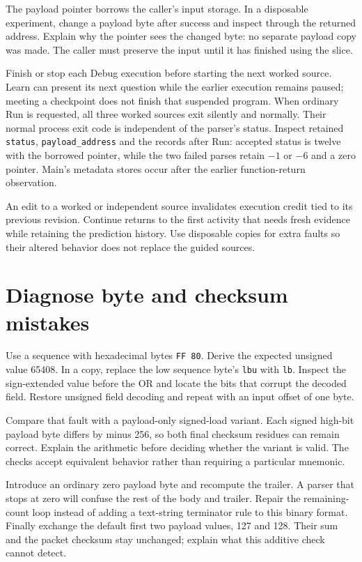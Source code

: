 

The payload pointer borrows the caller's input storage. In a disposable experiment,
change a payload byte after success and inspect through the returned address.
Explain why the pointer sees the changed byte: no separate payload copy was made.
The caller must preserve the input until it has finished using the slice.

Finish or stop each Debug execution before starting the next worked source.
Learn can present its next question while the earlier execution remains paused;
meeting a checkpoint does not finish that suspended program. When ordinary Run
is requested, all three worked sources exit silently and normally. Their normal
process exit code is independent of the parser's status. Inspect retained
\texttt{status}, \texttt{payload\_address} and the records after Run: accepted
status is twelve with the borrowed pointer, while the two failed parses retain
$-1$ or $-6$ and a zero pointer. Main's metadata stores occur after the earlier
function-return observation.

An edit to a worked or independent source invalidates execution credit tied to
its previous revision. Continue returns to the first activity that needs fresh
evidence while retaining the prediction history. Use disposable copies for
extra faults so their altered behavior does not replace the guided sources.

\section{Diagnose byte and checksum mistakes}

Use a sequence with hexadecimal bytes \texttt{FF 80}. Derive the expected unsigned
value 65408. In a copy, replace the low sequence byte's \texttt{lbu} with
\texttt{lb}. Inspect the sign-extended value before the OR and locate the bits
that corrupt the decoded field. Restore unsigned field decoding and repeat with
an input offset of one byte.

Compare that fault with a payload-only signed-load variant. Each signed high-bit
payload byte differs by minus 256, so both final checksum residues can remain
correct. Explain the arithmetic before deciding whether the variant is valid.
The checks accept equivalent behavior rather than requiring a particular mnemonic.

Introduce an ordinary zero payload byte and recompute the trailer. A parser that
stops at zero will confuse the rest of the body and trailer. Repair the remaining-
count loop instead of adding a text-string terminator rule to this binary format.
Finally exchange the default first two payload values, 127 and 128. Their sum and
the packet checksum stay unchanged; explain what this additive check cannot detect.

